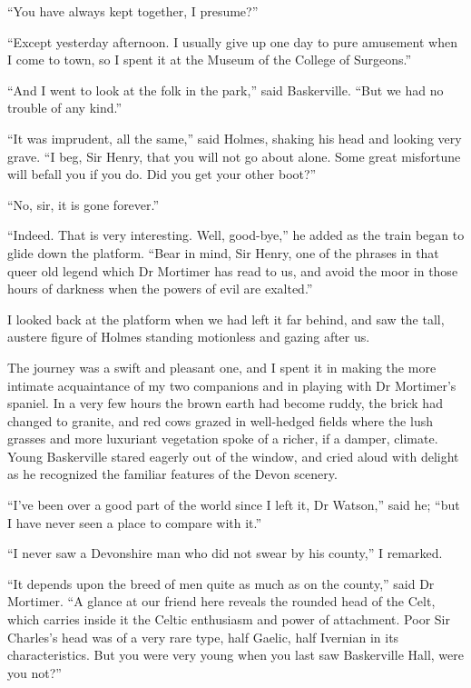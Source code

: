 \documentclass[paper=a5,BCOR=7mm,twoside,DIV=calc,12pt,usegeometry,openany,chapterprefix,endperiod,headings=big]{scrbook} %
\begin{document}
\enquote{You have always kept together, I presume?}

\enquote{Except yesterday afternoon. I usually give up one day to pure amusement when I come to town, so I spent it at the Museum of the College of Surgeons.}

\enquote{And I went to look at the folk in the park,} said Baskerville. \enquote{But we had no trouble of any kind.}

\enquote{It was imprudent, all the same,} said Holmes, shaking his head and looking very grave. \enquote{I beg, Sir Henry, that you will not go about alone. Some great misfortune will befall you if you do. Did you get your other boot?}

\enquote{No, sir, it is gone forever.}

\enquote{Indeed. That is very interesting. Well, good-bye,} he added as the train began to glide down the platform. \enquote{Bear in mind, Sir Henry, one of the phrases in that queer old legend which Dr Mortimer has read to us, and avoid the moor in those hours of darkness when the powers of evil are exalted.}

I looked back at the platform when we had left it far behind, and saw the tall, austere figure of Holmes standing motionless and gazing after us.

The journey was a swift and pleasant one, and I spent it in making the more intimate acquaintance of my two companions and in playing with Dr Mortimer's spaniel. In a very few hours the brown earth had become ruddy, the brick had changed to granite, and red cows grazed in well-hedged fields where the lush grasses and more luxuriant vegetation spoke of a richer, if a damper, climate. Young Baskerville stared eagerly out of the window, and cried aloud with delight as he recognized the familiar features of the Devon scenery.

\enquote{I've been over a good part of the world since I left it, Dr Watson,} said he; \enquote{but I have never seen a place to compare with it.}

\enquote{I never saw a Devonshire man who did not swear by his county,} I remarked.

\enquote{It depends upon the breed of men quite as much as on the county,} said Dr Mortimer. \enquote{A glance at our friend here reveals the rounded head of the Celt, which carries inside it the Celtic enthusiasm and power of attachment. Poor Sir Charles's head was of a very rare type, half Gaelic, half Ivernian in its characteristics. But you were very young when you last saw Baskerville Hall, were you not?}
\end{document}
